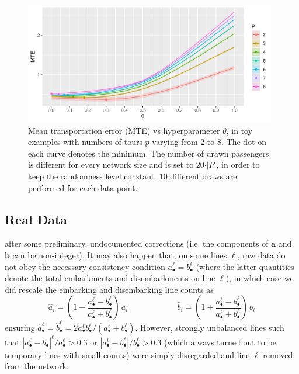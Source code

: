 \documentclass{bmcart}
\begin{document}
\begin{figure}
	\includegraphics[width=0.98\textwidth]{fig/MTE_tours.pdf}
	\caption{Mean transportation error (MTE) vs hyperparameter $\theta$, in toy examples with numbers of tours $p$ varying from 2 to 8. The dot on each curve denotes the minimum. The number of drawn passengers is different for every network size and is set to $20 \cdot \vert P \vert$, in order to keep the randomness level constant. $10$ different draws are performed for each data point.}
	\label{MTE_vs_theta}
\end{figure}


\subsection{Real Data}
\label{real_data}


after some preliminary, undocumented corrections (i.e. the components of $\mathbf{a}$ and $\mathbf{b}$ can be non-integer). It may also happen that, on some lines $\ell$,  raw data do not obey the necessary consistency condition  $a_\bullet^\ell=b_\bullet^\ell$ (where the latter quantities denote the total embarkments and disembarkments on line $\ell$), in which case we did rescale the embarking and disembarking line counts as 
\begin{displaymath}
	\hat{a}_i=(1-\frac{a_\bullet^\ell-b_\bullet^\ell}{a_\bullet^\ell+b_\bullet^\ell})\, a_i 
	\qquad\qquad\qquad
	\hat{b}_i=(1+\frac{a_\bullet^\ell-b_\bullet^\ell}{a_\bullet^\ell+b_\bullet^\ell})\,  b_i 
\end{displaymath}
ensuring $\hat{a}_\bullet^\ell=\hat{b}_\bullet^\ell=2a_\bullet^\ell b_\bullet^\ell/(a_\bullet^\ell+b_\bullet^\ell)$. However, strongly unbalanced lines such that  $|a_\bullet^\ell-b_\bullet|^\ell/a_\bullet^\ell > 0.3$ or $|a_\bullet^\ell-b_\bullet^\ell|/b_\bullet^\ell > 0.3$  (which always turned out to be temporary lines with small  counts) were simply disregarded and line $\ell$ removed from the network. 
\end{document}
